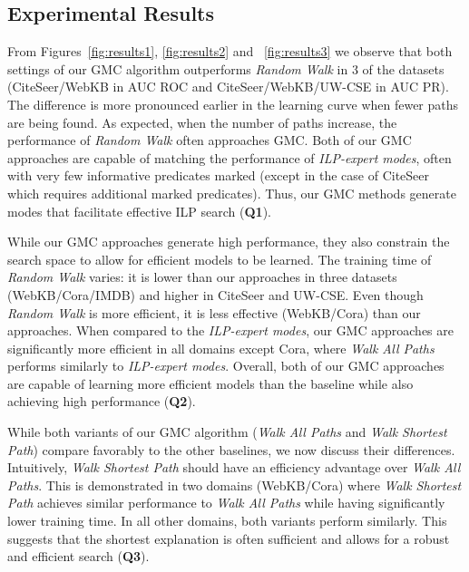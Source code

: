 \documentclass[sigconf]{acmart}
\begin{document}
\subsection{Experimental Results}


From Figures~\ref{fig:results1}, \ref{fig:results2} and ~\ref{fig:results3} we observe that both settings of our \textsc{GMC} algorithm outperforms \textit{Random Walk} in 3 of the datasets (CiteSeer/WebKB in AUC ROC and CiteSeer/WebKB/UW-CSE in AUC PR). The difference is more pronounced earlier in the learning curve when fewer paths are being found.  As expected, when the number of paths increase, the performance of \textit{Random Walk} often approaches \textsc{GMC}. Both of our \textsc{GMC} approaches are capable of matching the performance of \textit{ILP-expert modes}, often with very few informative predicates marked (except in the case of CiteSeer which requires additional marked predicates). Thus, our \textsc{GMC} methods generate modes that facilitate effective ILP search (\textbf{Q1}).


While our \textsc{GMC} approaches generate high performance, they also constrain the search space to allow for efficient models to be learned. The training time of \textit{Random Walk} varies: it is lower than our approaches in three datasets (WebKB/Cora/IMDB) and higher in CiteSeer and UW-CSE. Even though \textit{Random Walk} is more efficient, it is less effective (WebKB/Cora) than our approaches. When compared to the \textit{ILP-expert modes}, our \textsc{GMC} approaches are significantly more efficient in all domains except Cora, where \textit{Walk All Paths} performs similarly to \textit{ILP-expert modes}. Overall, both of our \textsc{GMC} approaches are capable of learning more efficient models than the baseline while also achieving high performance (\textbf{Q2}).


While both variants of our \textsc{GMC} algorithm (\textit{Walk All Paths} and \textit{Walk Shortest Path}) compare favorably to the other baselines, we now discuss their differences. Intuitively, \textit{Walk Shortest Path} should have an efficiency advantage over \textit{Walk All Paths}. This is demonstrated in two domains (WebKB/Cora) where \textit{Walk Shortest Path} achieves similar performance to \textit{Walk All Paths} while having significantly lower training time. In all other domains, both variants perform similarly. This suggests that the shortest explanation is often sufficient and allows for a robust and efficient search (\textbf{Q3}). 
\end{document}
